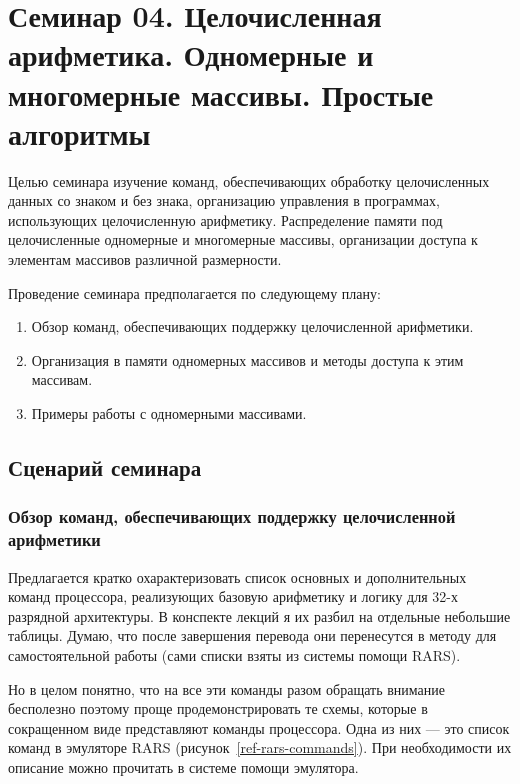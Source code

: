 \chapter[Целочисленная арифметика. Массивы]{Семинар 04. Целочисленная арифметика. Одномерные и многомерные массивы. Простые алгоритмы}

Целью семинара изучение команд, обеспечивающих обработку целочисленных данных со знаком и без знака, организацию управления в программах, использующих целочисленную арифметику. Распределение памяти под целочисленные одномерные и многомерные массивы, организации доступа к элементам массивов различной размерности.

Проведение семинара предполагается по следующему плану:
\begin{enumerate}
    \item Обзор команд, обеспечивающих поддержку целочисленной арифметики.
    \item Организация в памяти одномерных массивов и методы доступа к этим массивам.
    \item Примеры работы с одномерными массивами.
\end{enumerate}

\section{Сценарий семинара}


\subsection{Обзор команд, обеспечивающих поддержку целочисленной арифметики}

Предлагается кратко охарактеризовать список основных и дополнительных команд процессора, реализующих базовую арифметику и логику для 32-х разрядной архитектуры. В конспекте лекций я их разбил на отдельные небольшие таблицы. Думаю, что после завершения перевода они перенесутся в методу для самостоятельной работы (сами списки взяты из системы помощи RARS).

Но в целом понятно, что на все эти команды разом обращать внимание бесполезно поэтому проще продемонстрировать те схемы, которые в сокращенном виде представляют команды процессора. Одна из них --- это список команд в эмуляторе RARS (рисунок~\ref{ref-rars-commands}). При необходимости их описание можно прочитать в системе помощи эмулятора.

